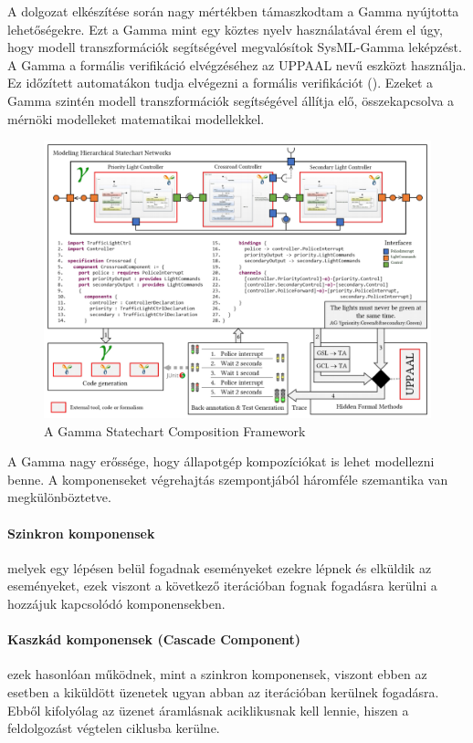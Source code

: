 A dolgozat elkészítése során nagy mértékben támaszkodtam a Gamma nyújtotta lehetőségekre. Ezt a Gamma mint egy köztes nyelv használatával érem el úgy, hogy modell transzformációk segítségével megvalósítok SysML-Gamma leképzést. A Gamma a formális verifikáció elvégzéséhez az UPPAAL nevű eszközt használja. Ez időzített automatákon tudja elvégezni a formális verifikációt (). Ezeket a Gamma szintén modell transzformációk segítségével állítja elő, összekapcsolva a mérnöki modelleket matematikai modellekkel.
\begin{figure}[!ht]
	\centering
	\includegraphics[width=140mm, keepaspectratio]{figures/preliminaries/gamma.png}
	\caption[]{A Gamma Statechart Composition Framework\footnotemark}
	\label{fig:gamma}
\end{figure}
\newpage
A Gamma nagy erőssége, hogy állapotgép kompozíciókat is lehet modellezni benne. A komponenseket végrehajtás szempontjából háromféle szemantika van megkülönböztetve.

\paragraph{Szinkron komponensek} melyek egy lépésen belül fogadnak eseményeket ezekre lépnek és elküldik az eseményeket, ezek viszont a következő iterációban fognak fogadásra kerülni a hozzájuk kapcsolódó komponensekben.

\paragraph{Kaszkád komponensek (Cascade Component)} ezek hasonlóan működnek, mint a szinkron komponensek, viszont ebben az esetben a kiküldött üzenetek ugyan abban az iterációban kerülnek fogadásra. Ebből kifolyólag az üzenet áramlásnak aciklikusnak kell lennie, hiszen a feldolgozást végtelen ciklusba kerülne.

